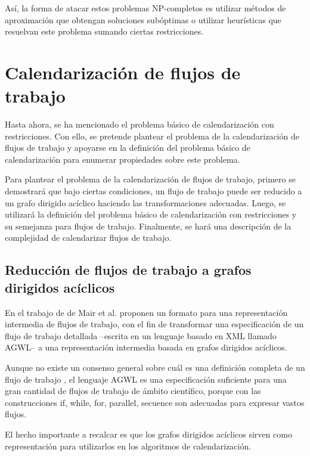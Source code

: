 \documentclass[letterpaper, 12pt]{report}
\begin{document}
Así, la forma de atacar estos problemas NP-completos es utilizar métodos de aproximación \cite{leiserson2001introduction} que obtengan soluciones subóptimas o utilizar heurísticas que resuelvan este problema sumando ciertas restricciones.

\section{Calendarización de flujos de trabajo}
Hasta ahora, se ha mencionado el problema básico de calendarización con restricciones. Con ello, se pretende plantear el problema de la calendarización de flujos de trabajo y apoyarse en la definición del problema básico de calendarización para enumerar propiedades sobre este problema.

Para plantear el problema de la calendarización de flujos de trabajo, primero se demostrará que bajo ciertas condiciones, un flujo de trabajo puede ser reducido a un grafo dirigido acíclico haciendo las transformaciones adecuadas. Luego, se utilizará la definición del problema básico de calendarización con restricciones y su semejanza para flujos de trabajo. Finalmente, se hará una descripción de la complejidad de calendarizar flujos de trabajo.
\subsection{Reducción de flujos de trabajo a grafos dirigidos acíclicos}
En el trabajo de de Mair et al. \cite{mair2007workflow} proponen un formato para una representación intermedia de flujos de trabajo, con el fin de transformar una especificación de un flujo de trabajo detallada --escrita en un lenguaje basado en XML llamado AGWL-- a una representación intermedia basada en grafos dirigidos acíclicos.

Aunque no existe un consenso general sobre cuál es una definición completa de un flujo de trabajo \cite{van2003workflow}, el lenguaje AGWL es una especificación suficiente para una gran cantidad de flujos de trabajo de ámbito científico, porque con las construcciones if, while, for, parallel, secuence son adecuadas para expresar vastos flujos.

El hecho importante a recalcar es que los grafos dirigidos acíclicos sirven como representación para utilizarlos en los algoritmos de calendarización.
\end{document}
